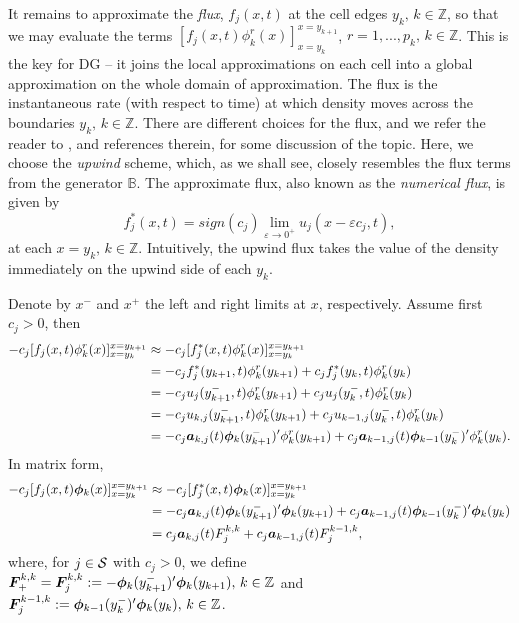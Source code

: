 It remains to approximate the \textit{flux}, \(f_j(x,t)\) at the cell edges \(y_k,\,k\in\mathbb Z\), so that we may evaluate the terms \([f_j(x,t)\phi^r_k(x)]_{x=y_k}^{x=y_{k+1}}\), \(r=1,...,p_k,\,k\in\mathbb Z\). This is the key for DG -- it joins the local approximations on each cell into a global approximation on the whole domain of approximation. The flux is the instantaneous rate (with respect to time) at which density moves across the boundaries \(y_k,\,k\in\mathbb Z\). There are different choices for the flux, and we refer the reader to \citep{c99,nodalDGBook}, and references therein, for some discussion of the topic. Here, we choose the \textit{upwind} scheme, which, as we shall see, closely resembles the flux terms from the generator \(\mathbb B\). The approximate flux, also known as the \textit{numerical flux}, is given by 
\[f^*_j(x,t) = sign(c_j)\lim_{\varepsilon\to0^+}u_j(x-\varepsilon c_j,t),\]
at each \(x=y_k,\,k\in\mathbb Z\). 
Intuitively, the upwind flux takes the value of the density immediately on the upwind side of each \(y_k\). 

Denote by \(x^-\) and \(x^+\) the left and right limits at \(x\), respectively. Assume first \(c_j>0\), then 
\begin{align*}
	-c_j[f_j(x,t)\phi^r_k(x)]_{x=y_k}^{x=y_{k+1}} & \approx -c_j[f_j^*(x,t)\phi^r_k(x)]_{x=y_k}^{x=y_{k+1}}
	\\& = -c_jf_j^*(y_{k+1},t)\phi^r_k(y_{k+1}) + c_jf_j^*(y_{k},t)\phi^r_k(y_{k})
	\\& = -c_ju_j(y_{k+1}^-,t)\phi^r_k(y_{k+1}) + c_ju_j(y_{k}^-,t)\phi^r_k(y_{k})
	\\& = -c_ju_{k,j}(y_{k+1}^-,t)\phi^r_k(y_{k+1}) + c_ju_{k-1,j}(y_{k}^-,t)\phi^r_k(y_{k})
	\\& = -c_j\boldsymbol a_{k,j}(t)\boldsymbol \phi_k(y_{k+1}^-)'{}\phi^r_k(y_{k+1}) + c_j\boldsymbol a_{k-1,j}(t)\boldsymbol \phi_{k-1}(y_{k}^-)'{}\phi^r_k(y_{k}).
\end{align*}
In matrix form,  
\begin{align*}
	-c_j[f_j(x,t)\boldsymbol\phi_k(x)]_{x=y_k}^{x=y_{k+1}} & \approx -c_j[f_j^*(x,t)\boldsymbol\phi_k(x)]_{x=y_k}^{x=y_{k+1}}
	\\& = -c_j\boldsymbol a_{k,j}(t)\boldsymbol \phi_k(y_{k+1}^-)'{}\boldsymbol\phi_k(y_{k+1}) + c_j\boldsymbol a_{k-1,j}(t)\boldsymbol \phi_{k-1}(y_{k}^-)'{}\boldsymbol\phi_k(y_{k})
	\\& = c_j\boldsymbol a_{k,j}(t)F_j^{k,k}+c_j\boldsymbol a_{k-1,j}(t)F_j^{k-1,k},
\end{align*}
where, for \(j\in \mathcal{S}\) with \(c_j>0\), we define \(\boldsymbol F_+^{k,k}=\boldsymbol F_j^{k,k} := -\boldsymbol \phi_k(y_{k+1}^-)'{}\boldsymbol\phi_k(y_{k+1}),\,k\in\mathbb Z\) and \(\boldsymbol F_j^{k-1,k} := \boldsymbol \phi_{k-1}(y_{k}^-)'{}\boldsymbol\phi_k(y_{k}),\,k\in\mathbb Z\).

